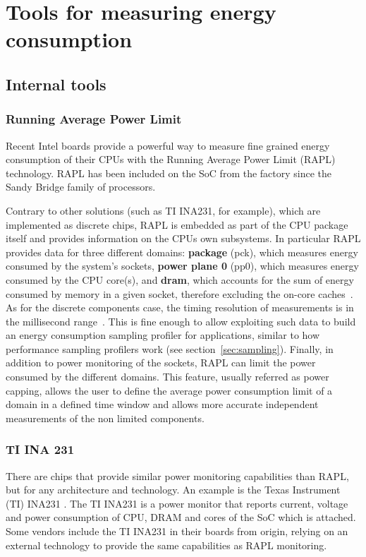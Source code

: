 \section*{Tools for measuring energy consumption}

\subsection{Internal tools}

\subsubsection*{Running Average Power Limit}
Recent Intel boards provide a powerful way to measure fine grained energy consumption of their CPUs with the Running Average Power Limit (RAPL) technology. RAPL has been included on the SoC from the factory since the Sandy Bridge family of processors.

Contrary to other solutions (such as TI INA231, for example), which are implemented as discrete
chips, RAPL is embedded as part of the CPU package itself and
provides information on the CPUs own subsystems. In particular RAPL
provides data for three different domains: \textbf{package} (pck),
which measures energy consumed by the system's sockets, \textbf{power
plane 0} (pp0), which measures energy consumed by the CPU core(s),
and \textbf{dram}, which accounts for the sum of energy consumed
by memory in a given socket, therefore excluding the on-core
caches~\cite{INTELMAN}. As for the discrete components case, the
timing resolution of measurements is in the millisecond range~\cite{RAPL1}.
This is fine enough to allow exploiting such data to build an energy
consumption sampling profiler for applications, similar to how performance
sampling profilers work (see section~\ref{sec:sampling}).
Finally, in addition to power
monitoring of the sockets, RAPL can limit the power consumed by the
different domains. This feature, usually referred as power capping,
allows the user to define the average power consumption limit of a
domain in a defined time window and allows more accurate independent
measurements of the non limited components.

\subsubsection*{TI INA 231}
There are chips that provide similar power monitoring capabilities than RAPL, but for any architecture and technology. An example is the Texas Instrument (TI) INA231 \cite{TIINA231}. The TI INA231 is a power monitor that reports current, voltage and power consumption of CPU, DRAM and cores of the SoC which is attached. Some vendors include the TI INA231 in their boards from origin, relying on an external technology to provide the same capabilities as RAPL monitoring.

